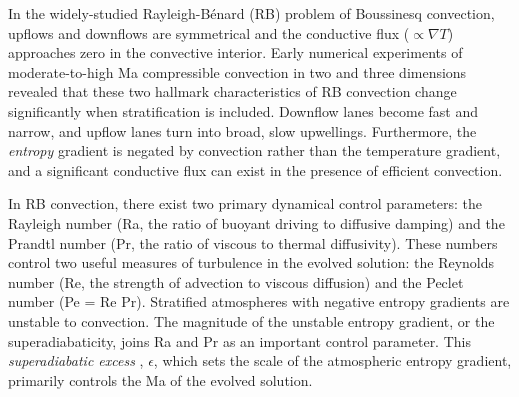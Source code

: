 \documentclass[aps, prl, twocolumn, nofootinbib, groupedaddress, amsfonts, amssymb, amsmath]{revtex4-1}
\newcommand{\grad}{\ensuremath{\nabla}}
\newcommand{\RB}{Rayleigh-B\'{e}nard }
\begin{document}

In the widely-studied \RB (RB) problem of Boussinesq convection, 
upflows and downflows are symmetrical and
the conductive flux ($\propto \grad T$) approaches zero in the convective interior.
Early numerical experiments of moderate-to-high Ma compressible convection
in two \cite{graham1975, chan&all1982,
hurlburt&all1984, cattaneo&all1990} and three 
\cite{cattaneo&all1991, brummell&all1996} dimensions
revealed that these two hallmark characteristics of RB convection change
significantly when stratification is included.  Downflow lanes
become fast and narrow, and upflow lanes turn into broad, slow upwellings.
Furthermore, the \emph{entropy} gradient is negated by convection 
rather than the temperature gradient, and
a significant conductive flux can exist in the presence of
efficient convection.

In RB convection, there exist two primary dynamical control parameters: 
the Rayleigh number (Ra, the ratio of
buoyant driving to diffusive damping) and the Prandtl number 
(Pr, the ratio of viscous to thermal
diffusivity). These numbers control two useful
measures of turbulence in the evolved solution:
the Reynolds
number (Re, the strength of advection to viscous diffusion)
and the Peclet number (Pe = Re Pr).  Stratified atmospheres
with negative entropy gradients are unstable to convection.
The magnitude of the unstable entropy gradient, or the superadiabaticity,
joins Ra and Pr as an important control parameter.  This 
\emph{superadiabatic excess} \cite{graham1975}, $\epsilon$, which 
sets the scale of the atmospheric entropy gradient,
primarily controls the Ma of the evolved solution.
\end{document}

